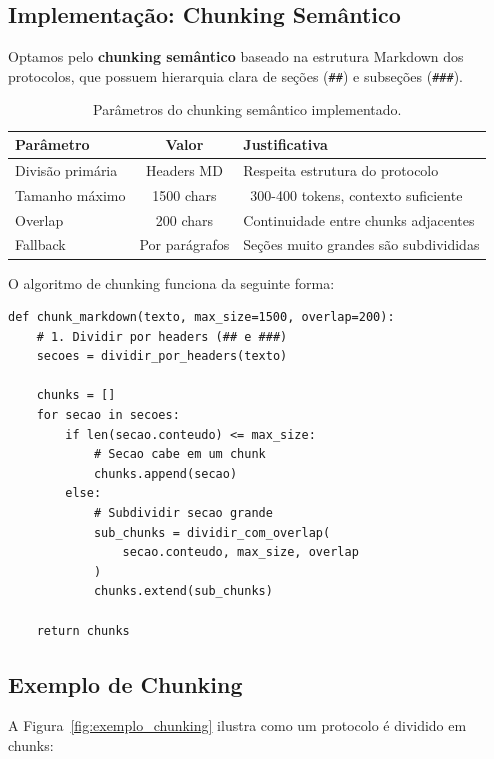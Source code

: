 \subsection{Implementação: Chunking Semântico}

Optamos pelo \textbf{chunking semântico} baseado na estrutura Markdown dos protocolos, que possuem hierarquia clara de seções (\texttt{\#\#}) e subseções (\texttt{\#\#\#}).

\begin{table}[H]
\centering
\caption{Parâmetros do chunking semântico implementado.}
\label{tab:chunking_params}
\begin{tabular}{l c l}
\toprule
\textbf{Parâmetro} & \textbf{Valor} & \textbf{Justificativa} \\
\midrule
Divisão primária & Headers MD & Respeita estrutura do protocolo \\
Tamanho máximo & 1500 chars & ~300-400 tokens, contexto suficiente \\
Overlap & 200 chars & Continuidade entre chunks adjacentes \\
Fallback & Por parágrafos & Seções muito grandes são subdivididas \\
\bottomrule
\end{tabular}
\end{table}

O algoritmo de chunking funciona da seguinte forma:

\begin{lstlisting}[caption={Algoritmo de chunking semântico simplificado.}]
def chunk_markdown(texto, max_size=1500, overlap=200):
    # 1. Dividir por headers (## e ###)
    secoes = dividir_por_headers(texto)

    chunks = []
    for secao in secoes:
        if len(secao.conteudo) <= max_size:
            # Secao cabe em um chunk
            chunks.append(secao)
        else:
            # Subdividir secao grande
            sub_chunks = dividir_com_overlap(
                secao.conteudo, max_size, overlap
            )
            chunks.extend(sub_chunks)

    return chunks
\end{lstlisting}

\subsection{Exemplo de Chunking}

A Figura~\ref{fig:exemplo_chunking} ilustra como um protocolo é dividido em chunks:

